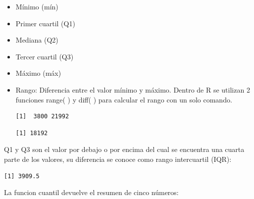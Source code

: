 \documentclass[
  letterpaper,
  DIV=11,
  numbers=noendperiod]{scrartcl}
\newenvironment{Shaded}{\begin{snugshade}}{\end{snugshade}}
\newcommand{\FunctionTok}[1]{\textcolor[rgb]{0.28,0.35,0.67}{#1}}
\newcommand{\NormalTok}[1]{\textcolor[rgb]{0.00,0.23,0.31}{#1}}
\newcommand{\SpecialCharTok}[1]{\textcolor[rgb]{0.37,0.37,0.37}{#1}}
\begin{document}
\begin{itemize}
\item
  Mínimo (mín)
\item
  Primer cuartil (Q1)
\item
  Mediana (Q2)
\item
  Tercer cuartil (Q3)
\item
  Máximo (máx)
\item
  Rango: Diferencia entre el valor mínimo y máximo. Dentro de R se
  utilizan 2 funciones range( ) y diff( ) para calcular el rango con un
  solo comando.

\begin{Shaded}
\end{Shaded}

\begin{verbatim}
[1]  3800 21992
\end{verbatim}

\begin{Shaded}
\end{Shaded}

\begin{verbatim}
[1] 18192
\end{verbatim}
\end{itemize}

Q1 y Q3 son el valor por debajo o por encima del cual se encuentra una
cuarta parte de los valores, su diferencia se conoce como rango
intercuartil (IQR):

\begin{Shaded}
\end{Shaded}

\begin{verbatim}
[1] 3909.5
\end{verbatim}

La funcion cuantil devuelve el resumen de cinco números:

\begin{Shaded}
\end{Shaded}
\end{document}

